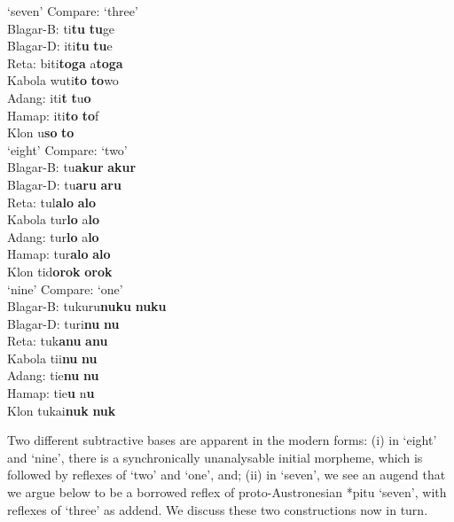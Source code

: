 \documentclass[output=paper]{LSP/langsci}
\begin{document}
\ea%
\label{ex:6:8} 
\ea 
\gllllllll {} 	`seven'	 Compare:	 `three'\\
Blagar-B:	 {ti}\textbf{{tu}} {}	 \textbf{{tu}}{ge}\\
Blagar-D:	 {{\texthtb}}{iti}\textbf{{tu}}	 {}	 \textbf{{tu}}{e}	 \\
Reta:	 	{biti}\textbf{{toga}}\textbf{}	 {}	 {a}\textbf{{toga}}	 \\
Kabola	 	{wuti}\textbf{{to}}	 {}	 \textbf{{to}}{wo}\textbf{}	 \\
Adang:	 	{iti}\textbf{{t}}{{\textopeno}}	 {}	 \textbf{{t}}{u}\textbf{{o}}\\
Hamap:	 	{iti}\textbf{{to}}	 {}	 \textbf{{to}}{f}\\
Klon	 	{u}\textbf{{so{\ng}}} {}		 \textbf{{to{\ng}}}\textbf{}	 \\
\ex	 
\gllllllll {}		`eight'	 Compare:	 `two'\\
Blagar-B:	 {tu}\textbf{{akur}}	 {}	 \textbf{{akur}}\\
Blagar-D:	 {tu}\textbf{{aru}}	 {}	 \textbf{{aru}}	 \\
Reta:		{tul}\textbf{{alo}} {}		 \textbf{{alo}}	 \\
Kabola	 	{tur}\textbf{{lo}}	 {}	 {a}\textbf{{lo}}\textbf{}	 \\
Adang:		 {tur}\textbf{{lo}}	 {}	 {a}\textbf{{lo}}\\
Hamap:	 	{tur}\textbf{{alo}}	 {}	 \textbf{{alo}}\\
Klon	 	{tid}\textbf{{orok}} {}		 \textbf{{orok}}\textbf{}	 \\
\ex	 
\gllllllll {}	`nine'	 Compare:	 `one'\\
Blagar-B:	 {tukuru}\textbf{{nuku}} {}		 \textbf{{nuku}}	 \\
Blagar-D:	 {turi}\textbf{{nu}}	 {}	 \textbf{{nu}}	 \\
Reta:	 	{tuk}\textbf{{anu}}	 {}	 \textbf{{anu}}\\
Kabola	 	{ti}{{\textglotstop}i}\textbf{{nu}} {}		 \textbf{{nu}}\textbf{}	 \\
Adang:	 	{ti}{{\textglotstop}e}\textbf{{nu}} {}		 \textbf{{nu}}\textbf{}	 \\
Hamap:		 {tie}\textbf{{u}}	 {}	 {n}\textbf{{u}}\textbf{}	 \\
Klon	 	{tukai}\textbf{{nuk}}	 {}	 \textbf{{nuk}}\\
\z
\z

Two different subtractive bases are apparent in the modern forms: (i) in `eight' and `nine', there is a synchronically unanalysable initial morpheme, which is followed by reflexes of `two' and `one', and; (ii) in `seven', we see an augend that we argue below to be a borrowed reflex of proto-Austronesian *pitu `seven', with reflexes of `three' as addend. We discuss these two constructions now in turn.
\end{document}
